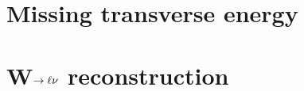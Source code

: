  

 

\section{Missing transverse energy}\label{sec:met}

\section{W$\rightarrow\ell\nu$ reconstruction}\label{sec:leptonicW}
